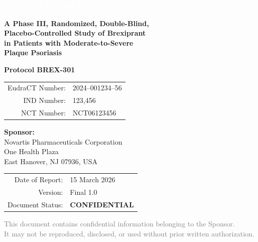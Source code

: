 \documentclass[11pt, a4paper]{article}
\newcommand{\protnum}{BREX-301}
\newcommand{\studydrug}{Brexiprant}
\begin{document}
\begin{titlepage}
\thispagestyle{empty}

\begin{tcolorbox}[
  colback=accent,
  colframe=accent,
  width=\textwidth,
  boxrule=0pt,
  sharp corners,
  left=0pt,
  right=0pt,
  top=6mm,
  bottom=6mm,
  before skip=0pt,
  after skip=0pt,
]
  \centering\textcolor{white}{\Large\bfseries CLINICAL STUDY REPORT}
\end{tcolorbox}

\vspace{20mm}

{\centering\LARGE\bfseries\color{secondary} A Phase III, Randomized, Double-Blind,\\[4pt] Placebo-Controlled Study of \studydrug\\[4pt] in Patients with Moderate-to-Severe\\[4pt] Plaque Psoriasis\par}

\vspace{12mm}

{\centering\large\color{accent}\bfseries Protocol \protnum\par}

\vspace{6mm}

{\centering
\begin{tabular}{rl}
EudraCT Number: & 2024--001234--56 \\
IND Number:     & 123,456 \\
NCT Number:     & NCT06123456 \\
\end{tabular}\par}

\vspace{18mm}

\begin{center}
{\large\bfseries\color{secondary} Sponsor:}\\[4pt]
{\large Novartis Pharmaceuticals Corporation}\\[3pt]
One Health Plaza\\[2pt]
East Hanover, NJ 07936, USA
\end{center}

\vspace{18mm}

{\centering
\begin{tabular}{rl}
Date of Report:  & 15 March 2026 \\
Version:         & Final 1.0 \\
Document Status: & \textbf{CONFIDENTIAL} \\
\end{tabular}\par}

\vfill
{\centering\textcolor{graytext}{\small This document contains confidential information belonging to the Sponsor.\\It may not be reproduced, disclosed, or used without prior written authorization.}\par}
\end{titlepage}
\end{document}
